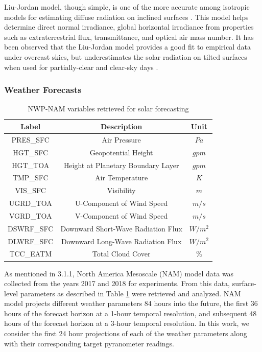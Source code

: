 Liu-Jordan model, though simple, is one of the more accurate among isotropic models for estimating diffuse radiation on inclined surfaces \cite{pvlib_liujordan3}. This model helps determine direct normal irradiance, global horizontal irradiance from properties such as extraterrestrial flux, transmittance, and optical air mass number. It has been observed that the Liu-Jordan model provides a good fit to empirical data under overcast skies, but underestimates the solar radiation on tilted surfaces when used for partially-clear and clear-sky days \cite{pvlib_liujordan4}.

\subsubsection*{Weather Forecasts}
\begin{table}[h]
\begin{center}
    \caption{NWP-NAM variables retrieved for solar forecasting}
    \label{Tab:table_nam_variables}
    \begin{tabular}{ c c c}
    	\toprule
    	\textbf{Label} & \textbf{Description} & \textbf{Unit} \\
    	\midrule
    	PRES\_SFC & Air Pressure & $Pa$\\
    	HGT\_SFC & Geopotential Height & $gpm$ \\
    	HGT\_TOA & Height at Planetary Boundary Layer & $gpm$ \\
    	TMP\_SFC & Air Temperature & $K$\\
    	VIS\_SFC & Visibility & $m$\\
    	UGRD\_TOA & U-Component of Wind Speed & $m/s$\\
    	VGRD\_TOA & V-Component of Wind Speed & $m/s$\\
    	DSWRF\_SFC & Downward Short-Wave Radiation Flux & $W/m^2$\\
    	DLWRF\_SFC & Downward Long-Wave Radiation Flux & $W/m^2$\\
    	TCC\_EATM & Total Cloud Cover & $\%$ \\
    	\bottomrule
    \end{tabular}
\end{center}
\end{table}

\par As mentioned in 3.1.1, North America Mesoscale (NAM) model data was collected from the years 2017 and 2018 for experiments. From this data, surface-level parameters as described in Table \ref{Tab:table_nam_variables} were retrieved and analyzed. NAM model projects different weather parameters 84 hours into the future, the first 36 hours of the forecast horizon at a 1-hour temporal resolution, and subsequent 48 hours of the forecast horizon at a 3-hour temporal resolution. In this work, we consider the first 24 hour projections of each of the weather parameters along with their corresponding target pyranometer readings.

